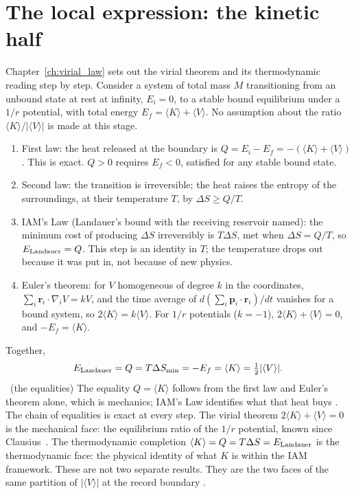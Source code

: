 \section{The local expression: the kinetic half}\label{sec:law_local}
Chapter~\ref{ch:virial_law} sets out the virial theorem and its thermodynamic reading step by step. Consider a system of total mass $M$ transitioning from
an unbound state at rest at infinity, $E_i=0$, to a stable bound equilibrium under a $1/r$ potential, with total energy $E_f=\langle K\rangle+\langle V\rangle$.
No assumption about the ratio $\langle K\rangle/|\langle V\rangle|$ is made at this stage.
\begin{enumerate}
\item First law: the heat released at the boundary is $Q=E_i-E_f=-(\langle K\rangle+\langle V\rangle)$. This is exact. $Q>0$ requires $E_f<0$, satisfied for
any stable bound state.
\item Second law: the transition is irreversible; the heat raises the entropy of the surroundings, at their temperature $T$, by $\Delta S\ge Q/T$.
\item IAM's Law (Landauer's bound with the receiving reservoir named): the minimum cost of producing $\Delta S$ irreversibly is $T\Delta S$, met when
$\Delta S=Q/T$, so $E_{\rm Landauer}=Q$. This step is an identity in $T$; the temperature drops out because it was put in, not because of new physics.
\item Euler's theorem: for $V$ homogeneous of degree $k$ in the coordinates, $\sum_i\mathbf r_i\cdot\nabla_iV=kV$, and the time average of
$d(\sum_i\mathbf p_i\cdot\mathbf r_i)/dt$ vanishes for a bound system, so $2\langle K\rangle=k\langle V\rangle$. For $1/r$ potentials ($k=-1$),
$2\langle K\rangle+\langle V\rangle=0$, and $-E_f=\langle K\rangle$.
\end{enumerate}
Together,
\begin{equation}
E_{\rm Landauer}=Q=T\Delta S_{\min}=-E_f=\langle K\rangle=\tfrac12|\langle V\rangle| . \label{eq:law_virialchain}
\end{equation}
\derived\ (the equalities) The equality $Q=\langle K\rangle$ follows from the first law and Euler's theorem alone, which is mechanics; IAM's Law identifies
what that heat buys \interp. The chain of equalities is exact at every step. The virial theorem $2\langle K\rangle+\langle V\rangle=0$ is the mechanical
face: the equilibrium ratio of the $1/r$ potential, known since Clausius~\cite{Clausius1870}. The thermodynamic completion
$\langle K\rangle=Q=T\Delta S=E_{\rm Landauer}$ is the thermodynamic face: the physical identity of what $K$ is within the IAM framework. These are not two
separate results. They are the two faces of the same partition of $|\langle V\rangle|$ at the record boundary \interp.

